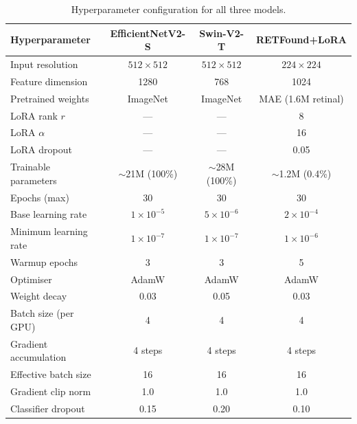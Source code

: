 \begin{table}[htbp]
\centering
\caption{Hyperparameter configuration for all three models.}
\label{tab:hyperparams}
\begin{tabular}{lccc}
\toprule
\textbf{Hyperparameter} & \textbf{EfficientNetV2-S} & \textbf{Swin-V2-T} & \textbf{RETFound+LoRA} \\
\midrule
Input resolution        & $512 \times 512$   & $512 \times 512$   & $224 \times 224$  \\
Feature dimension       & 1280               & 768                & 1024              \\
Pretrained weights      & ImageNet           & ImageNet           & MAE (1.6M retinal) \\
LoRA rank $r$           & ---                & ---                & 8                 \\
LoRA $\alpha$           & ---                & ---                & 16                \\
LoRA dropout            & ---                & ---                & 0.05              \\
Trainable parameters    & $\sim$21M (100\%)  & $\sim$28M (100\%)  & $\sim$1.2M (0.4\%) \\
\midrule
Epochs (max)            & 30                 & 30                 & 30                \\
Base learning rate      & $1 \times 10^{-5}$ & $5 \times 10^{-6}$ & $2 \times 10^{-4}$ \\
Minimum learning rate   & $1 \times 10^{-7}$ & $1 \times 10^{-7}$ & $1 \times 10^{-6}$ \\
Warmup epochs           & 3                  & 3                  & 5                 \\
Optimiser               & AdamW              & AdamW              & AdamW             \\
Weight decay            & 0.03               & 0.05               & 0.03              \\
Batch size (per GPU)    & 4                  & 4                  & 4                 \\
Gradient accumulation   & 4 steps            & 4 steps            & 4 steps           \\
Effective batch size    & 16                 & 16                 & 16                \\
Gradient clip norm      & 1.0                & 1.0                & 1.0               \\
Classifier dropout      & 0.15               & 0.20               & 0.10              \\

\end{tabular}
\end{table}
